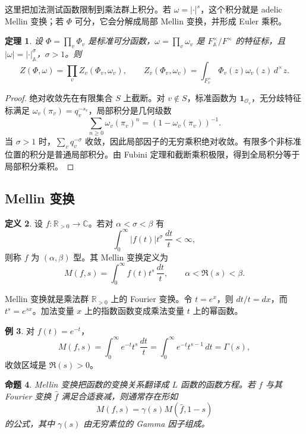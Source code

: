 \documentclass[11pt,a4paper,openany]{ctexbook}
\numberwithin{equation}{chapter}
\newcommand{\R}{\mathbb{R}}
\newcommand{\C}{\mathbb{C}}
\newcommand{\A}{\mathbb{A}}
\theoremstyle{plain}
\newtheorem{theorem}{定理}[chapter]
\newtheorem{proposition}[theorem]{命题}
\theoremstyle{definition}
\newtheorem{definition}[theorem]{定义}
\newtheorem{example}[theorem]{例}
\theoremstyle{remark}
\begin{document}
这里把加法测试函数限制到乘法群上积分。若 $\omega=|\cdot|^s$，这个积分就是 adelic Mellin 变换；若 $\Phi$ 可分，它会分解成局部 Mellin 变换，并形成 Euler 乘积。

\begin{theorem}
设 $\Phi=\prod_v\Phi_v$ 是标准可分函数，$\omega=\prod_v\omega_v$ 是 $F_{\A}^{\times}/F^\times$ 的特征标，且 $|\omega|=|\cdot|_{\A}^{\sigma}$，$\sigma>1$。则
\[
  Z(\Phi,\omega)
  =
  \prod_v Z_v(\Phi_v,\omega_v),
\qquad
  Z_v(\Phi_v,\omega_v)=\int_{F_v^\times}\Phi_v(z)\omega_v(z)\,d^\times z .
\]
\end{theorem}

\begin{proof}
绝对收敛先在有限集合 $S$ 上截断。对 $v\notin S$，标准函数为 $\mathbf 1_{\mathcal O_v}$，无分歧特征标满足 $\omega_v(\pi_v)=q_v^{-s_v}$，局部积分是几何级数
\[
  \sum_{n\ge0}\omega_v(\pi_v)^n
  =
  (1-\omega_v(\pi_v))^{-1}.
\]
当 $\sigma>1$ 时，$\sum_v q_v^{-\sigma}$ 收敛，因此局部因子的无穷乘积绝对收敛。有限多个非标准位置的积分是普通局部积分。由 Fubini 定理和截断乘积极限，得到全局积分等于局部积分乘积。
\end{proof}

\subsection{Mellin 变换}

\begin{definition}
设 $f:\R_{>0}\to\C$。若对 $\alpha<\sigma<\beta$ 有
\[
  \int_0^\infty |f(t)|t^\sigma\,\frac{dt}{t}<\infty,
\]
则称 $f$ 为 $(\alpha,\beta)$ 型。其 Mellin 变换定义为
\[
  M(f,s)=\int_0^\infty f(t)t^s\,\frac{dt}{t},
\qquad \alpha<\Re(s)<\beta .
\]
\end{definition}

Mellin 变换就是乘法群 $\R_{>0}$ 上的 Fourier 变换。令 $t=e^x$，则 $dt/t=dx$，而 $t^s=e^{sx}$。加法变量 $x$ 上的指数函数变成乘法变量 $t$ 上的幂函数。

\begin{example}
对 $f(t)=e^{-t}$，
\[
  M(f,s)=\int_0^\infty e^{-t}t^s\,\frac{dt}{t}
  =
  \int_0^\infty e^{-t}t^{s-1}\,dt
  =
  \Gamma(s),
\]
收敛区域是 $\Re(s)>0$。
\end{example}

\begin{proposition}
Mellin 变换把函数的变换关系翻译成 $L$ 函数的函数方程。若 $f$ 与其 Fourier 变换 $\widehat f$ 满足合适衰减，则通常存在形如
\[
  M(f,s)=\gamma(s)M(\widehat f,1-s)
\]
的公式，其中 $\gamma(s)$ 由无穷素位的 Gamma 因子组成。
\end{proposition}
\end{document}
